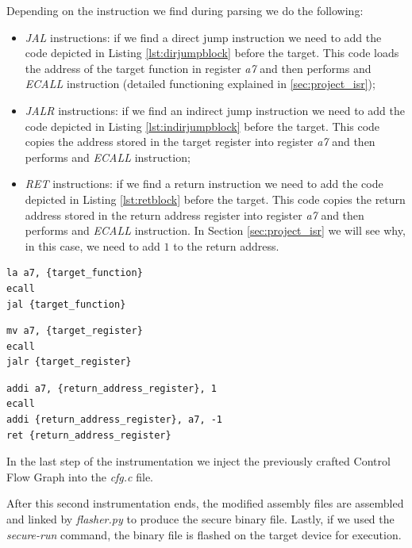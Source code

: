 Depending on the instruction we find during parsing we do the following:
\begin{itemize}
  \item \textit{JAL} instructions: if we find a direct jump instruction we need to
    add the code depicted in Listing \ref{lst:dirjumpblock} before the target.
    This code loads the address of the target function in register \textit{a7} and
    then performs and \textit{ECALL} instruction (detailed functioning explained
    in \ref{sec:project_isr});

  \item \textit{JALR} instructions: if we find an indirect jump instruction we need
    to add the code depicted in Listing \ref{lst:indirjumpblock} before the target.
    This code copies the address stored in the target register into register
    \textit{a7} and then performs and \textit{ECALL} instruction;

  \item \textit{RET} instructions: if we find a return instruction we need to add
    the code depicted in Listing \ref{lst:retblock} before the target. This code
    copies the return address stored in the return address register into
    register \textit{a7} and then performs and \textit{ECALL} instruction. In Section
    \ref{sec:project_isr} we will see why, in this case, we need to add $1$ to the
    return address.
\end{itemize}

\begin{lstlisting}[style=Assembly, caption = Direct jump code block, label={lst:dirjumpblock}]
la a7, {target_function}
ecall
jal {target_function}
\end{lstlisting}

\begin{lstlisting}[style=Assembly, caption = Indirect jump code block, label={lst:indirjumpblock}]
mv a7, {target_register}
ecall
jalr {target_register}
\end{lstlisting}

\begin{lstlisting}[style=Assembly, caption = Return code block, label={lst:retblock}]
addi a7, {return_address_register}, 1
ecall
addi {return_address_register}, a7, -1
ret {return_address_register}
\end{lstlisting}

In the last step of the instrumentation we inject the previously crafted Control
Flow Graph into the \textit{cfg.c} file.

After this second instrumentation ends, the modified assembly files are assembled
and linked by \textit{flasher.py} to produce the secure binary file. Lastly, if
we used the \textit{secure-run} command, the binary file is flashed on the
target device for execution.

